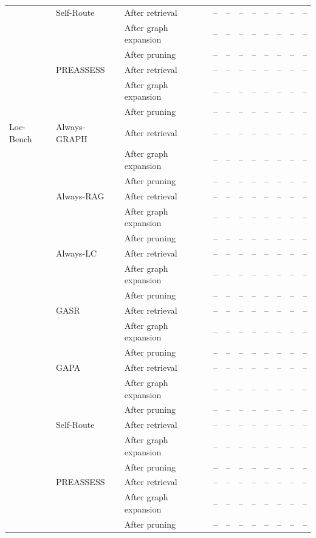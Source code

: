 \begin{table}[!ht]
{\begin{tabular}{@{}l l l ccc cc cc c@{}}
\midrule
 & Self-Route & After retrieval & -- & -- & -- & -- & -- & -- & -- & -- \\
 &  & After graph expansion & -- & -- & -- & -- & -- & -- & -- & -- \\
 &  & After pruning & -- & -- & -- & -- & -- & -- & -- & -- \\
\midrule
 & PREASSESS & After retrieval & -- & -- & -- & -- & -- & -- & -- & -- \\
 &  & After graph expansion & -- & -- & -- & -- & -- & -- & -- & -- \\
 &  & After pruning & -- & -- & -- & -- & -- & -- & -- & -- \\
\midrule
Loc-Bench & Always-GRAPH & After retrieval & -- & -- & -- & -- & -- & -- & -- & -- \\
 &  & After graph expansion & -- & -- & -- & -- & -- & -- & -- & -- \\
 &  & After pruning & -- & -- & -- & -- & -- & -- & -- & -- \\
\midrule
 & Always-RAG & After retrieval & -- & -- & -- & -- & -- & -- & -- & -- \\
 &  & After graph expansion & -- & -- & -- & -- & -- & -- & -- & -- \\
 &  & After pruning & -- & -- & -- & -- & -- & -- & -- & -- \\
\midrule
 & Always-LC & After retrieval & -- & -- & -- & -- & -- & -- & -- & -- \\
 &  & After graph expansion & -- & -- & -- & -- & -- & -- & -- & -- \\
 &  & After pruning & -- & -- & -- & -- & -- & -- & -- & -- \\
\midrule
 & GASR & After retrieval & -- & -- & -- & -- & -- & -- & -- & -- \\
 &  & After graph expansion & -- & -- & -- & -- & -- & -- & -- & -- \\
 &  & After pruning & -- & -- & -- & -- & -- & -- & -- & -- \\
\midrule
 & GAPA & After retrieval & -- & -- & -- & -- & -- & -- & -- & -- \\
 &  & After graph expansion & -- & -- & -- & -- & -- & -- & -- & -- \\
 &  & After pruning & -- & -- & -- & -- & -- & -- & -- & -- \\
\midrule
 & Self-Route & After retrieval & -- & -- & -- & -- & -- & -- & -- & -- \\
 &  & After graph expansion & -- & -- & -- & -- & -- & -- & -- & -- \\
 &  & After pruning & -- & -- & -- & -- & -- & -- & -- & -- \\
\midrule
 & PREASSESS & After retrieval & -- & -- & -- & -- & -- & -- & -- & -- \\
 &  & After graph expansion & -- & -- & -- & -- & -- & -- & -- & -- \\
 &  & After pruning & -- & -- & -- & -- & -- & -- & -- & -- \\
\bottomrule
\end{tabular}}
\end{table}

